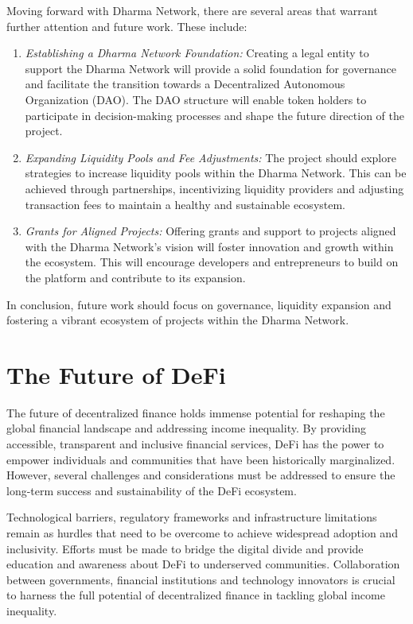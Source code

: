 Moving forward with Dharma Network, there are several areas that warrant further attention and future work. These include:

\begin{enumerate}
    \item \textit{Establishing a Dharma Network Foundation:} Creating a legal entity to support the Dharma Network will provide a solid foundation for governance and facilitate the transition towards a Decentralized Autonomous Organization (DAO). The DAO structure will enable token holders to participate in decision-making processes and shape the future direction of the project.
    \item \textit{Expanding Liquidity Pools and Fee Adjustments:} The project should explore strategies to increase liquidity pools within the Dharma Network. This can be achieved through partnerships, incentivizing liquidity providers and adjusting transaction fees to maintain a healthy and sustainable ecosystem.
    \item \textit{Grants for Aligned Projects:} Offering grants and support to projects aligned with the Dharma Network's vision will foster innovation and growth within the ecosystem. This will encourage developers and entrepreneurs to build on the platform and contribute to its expansion.
\end{enumerate}

In conclusion, future work should focus on governance, liquidity expansion and fostering a vibrant ecosystem of projects within the Dharma Network.

\section{The Future of DeFi}

The future of decentralized finance holds immense potential for reshaping the global financial landscape and addressing income inequality. By providing accessible, transparent and inclusive financial services, DeFi has the power to empower individuals and communities that have been historically marginalized. However, several challenges and considerations must be addressed to ensure the long-term success and sustainability of the DeFi ecosystem.\newline

Technological barriers, regulatory frameworks and infrastructure limitations remain as hurdles that need to be overcome to achieve widespread adoption and inclusivity. Efforts must be made to bridge the digital divide and provide education and awareness about DeFi to underserved communities. Collaboration between governments, financial institutions and technology innovators is crucial to harness the full potential of decentralized finance in tackling global income inequality.\newline

